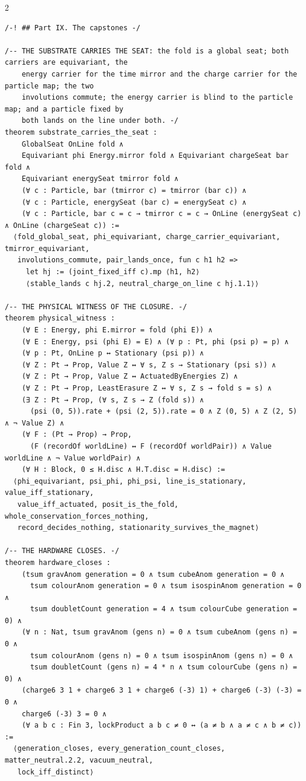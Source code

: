 \documentclass[10pt]{article}
\begin{document}
\begin{multicols}{2}
\begin{Verbatim}[fontsize=\fontsize{6.2}{7.2}\selectfont,breaklines,breakanywhere,breaksymbolleft={}]
/-! ## Part IX. The capstones -/

/-- THE SUBSTRATE CARRIES THE SEAT: the fold is a global seat; both carriers are equivariant, the
    energy carrier for the time mirror and the charge carrier for the particle map; the two
    involutions commute; the energy carrier is blind to the particle map; and a particle fixed by
    both lands on the line under both. -/
theorem substrate_carries_the_seat :
    GlobalSeat OnLine fold ∧
    Equivariant phi Energy.mirror fold ∧ Equivariant chargeSeat bar fold ∧
    Equivariant energySeat tmirror fold ∧
    (∀ c : Particle, bar (tmirror c) = tmirror (bar c)) ∧
    (∀ c : Particle, energySeat (bar c) = energySeat c) ∧
    (∀ c : Particle, bar c = c → tmirror c = c → OnLine (energySeat c) ∧ OnLine (chargeSeat c)) :=
  ⟨fold_global_seat, phi_equivariant, charge_carrier_equivariant, tmirror_equivariant,
   involutions_commute, pair_lands_once, fun c h1 h2 =>
     let hj := (joint_fixed_iff c).mp ⟨h1, h2⟩
     ⟨stable_lands c hj.2, neutral_charge_on_line c hj.1.1⟩⟩

/-- THE PHYSICAL WITNESS OF THE CLOSURE. -/
theorem physical_witness :
    (∀ E : Energy, phi E.mirror = fold (phi E)) ∧
    (∀ E : Energy, psi (phi E) = E) ∧ (∀ p : Pt, phi (psi p) = p) ∧
    (∀ p : Pt, OnLine p ↔ Stationary (psi p)) ∧
    (∀ Z : Pt → Prop, Value Z ↔ ∀ s, Z s → Stationary (psi s)) ∧
    (∀ Z : Pt → Prop, Value Z ↔ ActuatedByEnergies Z) ∧
    (∀ Z : Pt → Prop, LeastErasure Z ↔ ∀ s, Z s → fold s = s) ∧
    (∃ Z : Pt → Prop, (∀ s, Z s → Z (fold s)) ∧
      (psi (0, 5)).rate + (psi (2, 5)).rate = 0 ∧ Z (0, 5) ∧ Z (2, 5) ∧ ¬ Value Z) ∧
    (∀ F : (Pt → Prop) → Prop,
      (F (recordOf worldLine) ↔ F (recordOf worldPair)) ∧ Value worldLine ∧ ¬ Value worldPair) ∧
    (∀ H : Block, 0 ≤ H.disc ∧ H.T.disc = H.disc) :=
  ⟨phi_equivariant, psi_phi, phi_psi, line_is_stationary, value_iff_stationary,
   value_iff_actuated, posit_is_the_fold, whole_conservation_forces_nothing,
   record_decides_nothing, stationarity_survives_the_magnet⟩

/-- THE HARDWARE CLOSES. -/
theorem hardware_closes :
    (tsum gravAnom generation = 0 ∧ tsum cubeAnom generation = 0 ∧
      tsum colourAnom generation = 0 ∧ tsum isospinAnom generation = 0 ∧
      tsum doubletCount generation = 4 ∧ tsum colourCube generation = 0) ∧
    (∀ n : Nat, tsum gravAnom (gens n) = 0 ∧ tsum cubeAnom (gens n) = 0 ∧
      tsum colourAnom (gens n) = 0 ∧ tsum isospinAnom (gens n) = 0 ∧
      tsum doubletCount (gens n) = 4 * n ∧ tsum colourCube (gens n) = 0) ∧
    (charge6 3 1 + charge6 3 1 + charge6 (-3) 1) + charge6 (-3) (-3) = 0 ∧
    charge6 (-3) 3 = 0 ∧
    (∀ a b c : Fin 3, lockProduct a b c ≠ 0 ↔ (a ≠ b ∧ a ≠ c ∧ b ≠ c)) :=
  ⟨generation_closes, every_generation_count_closes, matter_neutral.2.2, vacuum_neutral,
   lock_iff_distinct⟩


\end{Verbatim}
\end{multicols}
\end{document}
